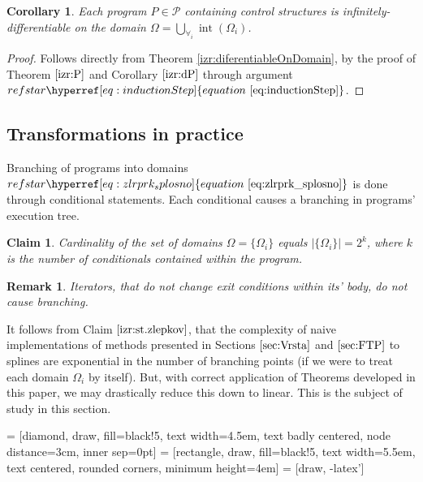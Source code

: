 \documentclass{article}
\makeatletter
\newcommand{\dP}{\mathcal{P}}
\DeclareMathOperator{\interior}{int}
\newtheorem{trditev}{Claim}[section]
\newtheorem{opomba}{Remark}[section]
\newtheorem{corollary}{Corollary}[section]
\let\originaleqref\eqref %
\renewcommand{\eqref}[1]{%
  \begingroup%
  \let\ref\@refstar%
  \hyperref[#1]{%
    equation%
    ~\originaleqref{#1}%
  }%
  \endgroup
}
\makeatother
\begin{document}
 \begin{corollary}
\label{izr:infDiferentiableOnDomain}
  Each program $P\in\dP$ containing control structures is infinitely-differentiable on the domain $\Omega=\bigcup\limits_{\forall_i}\interior(\Omega_i)$.
 \end{corollary}
 \begin{proof}
 Follows directly from Theorem \ref{izr:diferentiableOnDomain}, by the proof of Theorem $\ref{izr:P}$ and Corollary $\ref{izr:dP}$ through argument $\eqref{eq:inductionStep}$.
 \end{proof}

\subsection{Transformations in practice} \label{sec:TransInPractice}

Branching of programs into domains $\eqref{eq:zlrprk_splosno}$ is done through conditional statements. Each conditional causes a branching in programs' execution tree.

\begin{trditev}\label{izr:st.zlepkov}
Cardinality of the set of domains $\Omega=\{\Omega_i\}$ equals $\lvert\{\Omega_i \}\rvert=2^k$, where $k$ is the number of conditionals contained within the program.
\end{trditev}
\begin{opomba}
Iterators, that do not change exit conditions within its' body, do not cause branching.
\end{opomba}

It follows from Claim $\ref{izr:st.zlepkov}$, that the complexity of naive implementations of methods presented in Sections $\ref{sec:Vrsta}$ and $\ref{sec:FTP}$ to splines are exponential in the number of branching points (if we were to treat each domain $\Omega_i$ by itself). But, with correct application of Theorems developed in this paper, we may drastically reduce this down to linear. This is the subject of study in this section.
\vspace{10px}

 = [diamond, draw, fill=black!5, 
    text width=4.5em, text badly centered, node distance=3cm, inner sep=0pt]
 = [rectangle, draw, fill=black!5, 
    text width=5.5em, text centered, rounded corners, minimum height=4em]
 = [draw, -latex']
\end{document}

